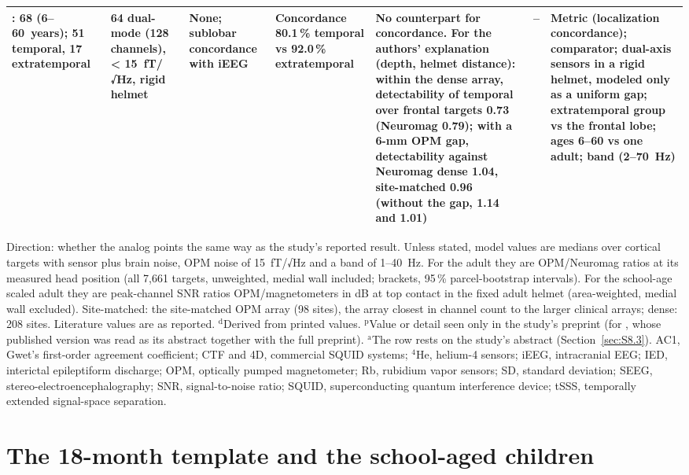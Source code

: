 \documentclass[preprint,12pt,authoryear,a4paper]{elsarticle}
\begin{document}
\begin{table}
\begin{tabular}{L{2.7cm}L{2.1cm}L{2.9cm}L{3.3cm}L{5.7cm}L{2.2cm}L{4.1cm}}
\citet{shen2026}: 68 (6--60~years); 51 temporal, 17 extratemporal & 64 dual-mode (128 channels), < 15~fT/√Hz, rigid helmet & None; sublobar concordance with iEEG & Concordance 80.1\,\% temporal vs 92.0\,\% extratemporal & No counterpart for concordance. For the authors' explanation (depth, helmet distance): within the dense array, detectability of temporal over frontal targets 0.73 (Neuromag 0.79); with a 6-mm OPM gap, detectability against Neuromag dense 1.04, site-matched 0.96 (without the gap, 1.14 and 1.01) & -- & Metric (localization concordance); comparator; dual-axis sensors in a rigid helmet, modeled only as a uniform gap; extratemporal group vs the frontal lobe; ages 6--60 vs one adult; band (2--70~Hz) \\
\bottomrule
\end{tabular}
\par\smallskip
{\footnotesize\raggedright Direction: whether the analog points the same way as the study's reported result. Unless stated, model values are medians over cortical targets with sensor plus brain noise, OPM noise of 15~fT/√Hz and a band of 1–40~Hz. For the adult they are OPM/Neuromag ratios at its measured head position (all 7,661 targets, unweighted, medial wall included; brackets, 95\,\% parcel-bootstrap intervals). For the school-age scaled adult they are peak-channel SNR ratios OPM/magnetometers in dB at top contact in the fixed adult helmet (area-weighted, medial wall excluded). Site-matched: the site-matched OPM array (98 sites), the array closest in channel count to the larger clinical arrays; dense: 208 sites. Literature values are as reported. $^{\mathrm{d}}$Derived from printed values. $^{\mathrm{p}}$Value or detail seen only in the study's preprint (for \citet{feys2022}, whose published version was read as its abstract together with the full preprint). $^{\mathrm{a}}$The row rests on the study's abstract (Section~\ref{sec:S8.3}). AC1, Gwet's first-order agreement coefficient; CTF and 4D, commercial SQUID systems; $^{4}$He, helium-4 sensors; iEEG, intracranial EEG; IED, interictal epileptiform discharge; OPM, optically pumped magnetometer; Rb, rubidium vapor sensors; SD, standard deviation; SEEG, stereo-electroencephalography; SNR, signal-to-noise ratio; SQUID, superconducting quantum interference device; tSSS, temporally extended signal-space separation.\par}
\end{table}

\section{The 18-month template and the school-aged children}\label{sec:S10}
\end{document}
